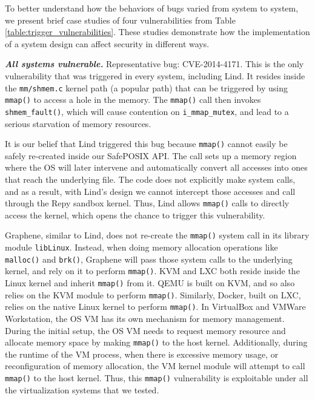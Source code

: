 {{{To better understand how the behaviors of bugs varied
from system to system, we present brief case studies of four
vulnerabilities from Table \ref{table:trigger_vulnerabilities}.
These
studies demonstrate how the implementation of a system design can
affect security in different ways.

\emph{\textbf{All systems vulnerable.}}  Representative bug: CVE-2014-4171.
This is the only vulnerability that was triggered in every
system, including Lind. It resides inside the \texttt{mm/shmem.c} kernel
path (a popular path) that
can be triggered by using \texttt{mmap()} to access a hole in the memory.
The \texttt{mmap()} call then invokes \texttt{shmem\_fault()}, which will cause contention
on \texttt{i\_mmap\_mutex}, and lead to a serious starvation of memory resources.

It is our belief that Lind triggered this bug because \texttt{mmap()} cannot easily
be safely re-created inside our SafePOSIX API. The call sets up a
memory region where the OS will later
intervene and automatically convert all accesses into ones that reach the
underlying file.  The code does not explicitly make system calls, and as
a result, with Lind's design we cannot intercept those accesses and call through
the Repy sandbox kernel. Thus,
Lind allows \texttt{mmap()} calls to directly access the kernel, which
opens the chance to trigger this vulnerability.

Graphene, similar to Lind, does not re-create the
\texttt{mmap()} system call in its library module \texttt{libLinux}. Instead, when doing
memory allocation operations like \texttt{malloc()} and \texttt{brk()}, Graphene will
pass those system calls to the underlying kernel, and rely on it to
perform \texttt{mmap()}.
KVM and LXC both reside inside the Linux kernel and inherit \texttt{mmap()}
from it. QEMU is built on KVM, and so also relies on the KVM module to perform
\texttt{mmap()}. Similarly, Docker, built on LXC, relies on the native Linux kernel to perform
\texttt{mmap()}. In VirtualBox and VMWare Workstation, the OS VM has its own mechanism
for memory management. During the initial setup, the OS VM needs to request memory resource
and allocate memory space by making \texttt{mmap()} to the host kernel. Additionally, during the runtime of the VM process,
when there is excessive memory usage, or reconfiguration of memory allocation, the VM kernel module
will attempt to call \texttt{mmap()} to the host kernel. Thus, this \texttt{mmap()} vulnerability
is exploitable under all the virtualization systems that we tested.

}}}
